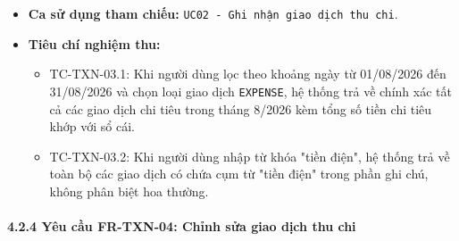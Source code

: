 \documentclass[11pt,a4paper]{article}
\providecommand{\tightlist}{
  \setlength{\itemsep}{0pt}\setlength{\parskip}{0pt}}
\begin{document}
\begin{itemize}
  \begin{itemize}
  \tightlist
  \item
    Danh sách các bản ghi giao dịch thỏa mãn điều kiện lọc (kèm thông
    tin phân trang).
  \item
    Tổng số bản ghi tìm thấy.
  \item
    Thống kê tổng hợp: Tổng thu nhập, Tổng chi tiêu, Chênh lệch dòng
    tiền thuần của tập kết quả.
  \end{itemize}
\item
  \textbf{Ca sử dụng tham chiếu:}
  \texttt{UC02\ -\ Ghi\ nhận\ giao\ dịch\ thu\ chi}.
\item
  \textbf{Tiêu chí nghiệm thu:}

  \begin{itemize}
  \tightlist
  \item
    TC-TXN-03.1: Khi người dùng lọc theo khoảng ngày từ 01/08/2026 đến
    31/08/2026 và chọn loại giao dịch \texttt{EXPENSE}, hệ thống trả về
    chính xác tất cả các giao dịch chi tiêu trong tháng 8/2026 kèm tổng
    số tiền chi tiêu khớp với sổ cái.
  \item
    TC-TXN-03.2: Khi người dùng nhập từ khóa "tiền điện", hệ thống trả
    về toàn bộ các giao dịch có chứa cụm từ "tiền điện" trong phần ghi
    chú, không phân biệt hoa thường.
  \end{itemize}
\end{itemize}

\newpage

\paragraph{4.2.4 Yêu cầu FR-TXN-04: Chỉnh sửa giao dịch thu
chi}\label{424-yuxeau-cux1ea7u-fr-txn-04-chux1ec9nh-sux1eeda-giao-dux1ecbch-thu-chi}
\end{document}
